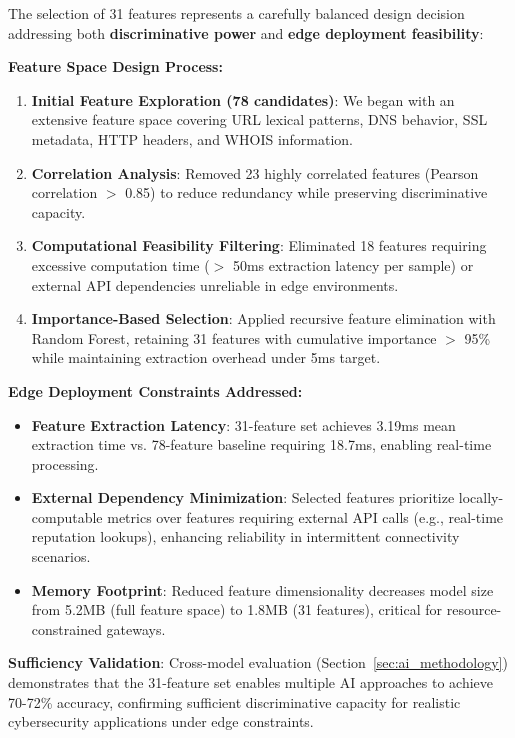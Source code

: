 \documentclass[conference]{IEEEtran}
\begin{document}
The selection of 31 features represents a carefully balanced design decision addressing both \textbf{discriminative power} and \textbf{edge deployment feasibility}:

\textbf{Feature Space Design Process:}
\begin{enumerate}
\item \textbf{Initial Feature Exploration (78 candidates)}: We began with an extensive feature space covering URL lexical patterns, DNS behavior, SSL metadata, HTTP headers, and WHOIS information.
\item \textbf{Correlation Analysis}: Removed 23 highly correlated features (Pearson correlation $>$ 0.85) to reduce redundancy while preserving discriminative capacity.
\item \textbf{Computational Feasibility Filtering}: Eliminated 18 features requiring excessive computation time ($>$ 50ms extraction latency per sample) or external API dependencies unreliable in edge environments.
\item \textbf{Importance-Based Selection}: Applied recursive feature elimination with Random Forest, retaining 31 features with cumulative importance $>$ 95\% while maintaining extraction overhead under 5ms target.
\end{enumerate}

\textbf{Edge Deployment Constraints Addressed:}
\begin{itemize}
\item \textbf{Feature Extraction Latency}: 31-feature set achieves 3.19ms mean extraction time vs. 78-feature baseline requiring 18.7ms, enabling real-time processing.
\item \textbf{External Dependency Minimization}: Selected features prioritize locally-computable metrics over features requiring external API calls (e.g., real-time reputation lookups), enhancing reliability in intermittent connectivity scenarios.
\item \textbf{Memory Footprint}: Reduced feature dimensionality decreases model size from 5.2MB (full feature space) to 1.8MB (31 features), critical for resource-constrained gateways.
\end{itemize}

\textbf{Sufficiency Validation}: Cross-model evaluation (Section~\ref{sec:ai_methodology}) demonstrates that the 31-feature set enables multiple AI approaches to achieve 70-72\% accuracy, confirming sufficient discriminative capacity for realistic cybersecurity applications under edge constraints.
\end{document}
